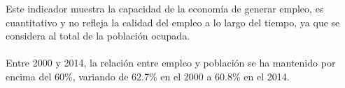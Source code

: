  Este indicador muestra la capacidad de la economía de generar empleo, es cuantitativo y no refleja la calidad del empleo a lo largo del tiempo, ya que se considera al total de la población ocupada. \\\\
 Entre 2000 y 2014, la relación entre empleo y población se ha mantenido por encima del 60\%, variando de 62.7\% en el 2000 a 60.8\% en el 2014.